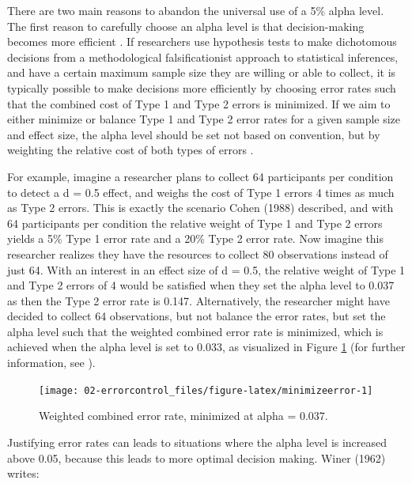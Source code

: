 \documentclass[
  oneside]{book}
\begin{document}
There are two main reasons to abandon the universal use of a 5\% alpha level. The first reason to carefully choose an alpha level is that decision-making becomes more efficient \citep{mudge_setting_2012}. If researchers use hypothesis tests to make dichotomous decisions from a methodological falsificationist approach to statistical inferences, and have a certain maximum sample size they are willing or able to collect, it is typically possible to make decisions more efficiently by choosing error rates such that the combined cost of Type 1 and Type 2 errors is minimized. If we aim to either minimize or balance Type 1 and Type 2 error rates for a given sample size and effect size, the alpha level should be set not based on convention, but by weighting the relative cost of both types of errors \citep{maier_justify_2022}.

For example, imagine a researcher plans to collect 64 participants per condition to detect a d = 0.5 effect, and weighs the cost of Type 1 errors 4 times as much as Type 2 errors. This is exactly the scenario Cohen (1988) described, and with 64 participants per condition the relative weight of Type 1 and Type 2 errors yields a 5\% Type 1 error rate and a 20\% Type 2 error rate. Now imagine this researcher realizes they have the resources to collect 80 observations instead of just 64. With an interest in an effect size of d = 0.5, the relative weight of Type 1 and Type 2 errors of 4 would be satisfied when they set the alpha level to 0.037 as then the Type 2 error rate is 0.147. Alternatively, the researcher might have decided to collect 64 observations, but not balance the error rates, but set the alpha level such that the weighted combined error rate is minimized, which is achieved when the alpha level is set to 0.033, as visualized in Figure \ref{fig:minimizeerror} (for further information, see \citet{maier_justify_2022}).

\begin{figure}

{\centering \texttt{[image: 02-errorcontrol\_files/figure-latex/minimizeerror-1]} 

}

\caption{Weighted combined error rate, minimized at alpha = 0.037.}\label{fig:minimizeerror}
\end{figure}

Justifying error rates can leads to situations where the alpha level is increased above 0.05, because this leads to more optimal decision making. Winer (1962) writes:
\end{document}
